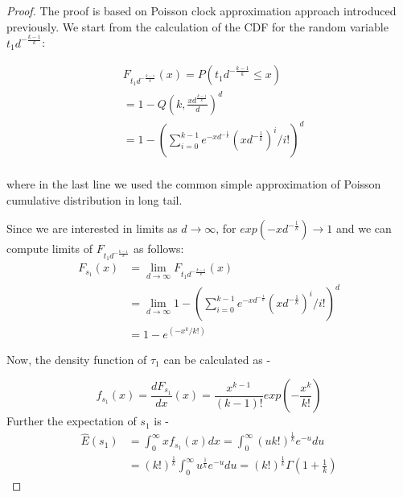 \begin{proof}
 The proof is based on Poisson clock approximation approach
introduced {previously.} 
We start from the calculation of the CDF for the random variable $%
t_1 d^{-\frac{k-1}{k}}$:


\begin{equation}
\begin{aligned} &F_{t_1 d^{-\frac{k-1}{k}}}(x)=P(t_1 d^{-\frac{k-1}{k}}\leq
x)\\
&=1-Q(k,\frac{xd^{\frac{k-1}{k}}}{d})^d%
\\
&=1-\left(\sum_{i=0}^{k-1}e^{-xd^{-\frac{1}{k}}}(xd^{-%
\frac{1}{k}})^i/i!\right)^d\\ \label{eq-prof-1}
 \end{aligned}
\end{equation}

where in the last line we used the common simple approximation of Poisson
cumulative distribution in long tail.

Since we are interested in limits as $d\rightarrow \infty$, for $%
exp(-xd^{-\frac{1}{k}})\rightarrow 1$ and we can compute limits of $F_{t_1
d^{-\frac{k-1}{k}}}$ 
as follows: 
\begin{equation}
\begin{aligned} F_{s_1}(x)&=\lim_{d\rightarrow\infty}F_{t_1
d^{-\frac{k-1}{k}}}(x)\\&=\lim_{d\rightarrow\infty}1-\left(\sum_{i=0}^{k-1}e^{-xd^{-\frac{1}{k}}}(xd^{-%
\frac{1}{k}})^i/i!\right)^d \\&=
1-e^{(-x^k/k!)} \label{eq-prof-cdf1} \end{aligned}
\end{equation}

Now, the density function of $\tau_1$ can be calculated as - 

\begin{equation}
f_{s_1}(x)=\frac{dF_{s_1}}{dx}(x)=\frac{x^{k-1}}{(k-1)!}exp%
\left(-\frac{x^{k}}{k!}\right)
\end{equation}
Further the expectation of $s_{1}$ is - 
 \begin{equation}
\begin{aligned}
\hat E(s_1)&=\int_{0}^{\infty}xf_{s_1}(x)dx=\int_{0}^{\infty}%
\left(uk!\right)^{\frac{1}{k}}e^{-u}du\\&=\left(k!\right)^{\frac{1}{k}}%
\int_{0}^{\infty}u^{\frac{1}{k}}e^{-u}du=\left(k!\right)^{\frac{1}{k}}\Gamma%
\left(1+\frac{1}{k}\right) \label{e-tau-1} 
\end{aligned}
\end{equation}
\end{proof}



